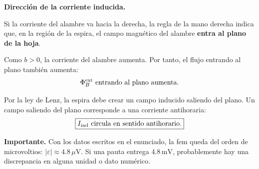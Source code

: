 \documentclass[11pt]{article}
\newcommand{\importante}[1]{%
  \par\medskip
  \noindent\textbf{Importante.} #1\par
}
\newcommand{\paso}[1]{%
  \par\medskip
  \noindent\textbf{#1}\par
  \vspace{0.1em}%
}
\begin{document}
\paso{Direcci\'on de la corriente inducida.}
Si la corriente del alambre va hacia la derecha, la regla de la mano derecha indica que, en la regi\'on de la espira, el campo magn\'etico del alambre \textbf{entra al plano de la hoja}.

Como $b>0$, la corriente del alambre aumenta. Por tanto, el flujo entrando al plano tambi\'en aumenta:
\begin{equation*}
    \Phi_B^{\rm ext}\ \text{entrando al plano aumenta}.
\end{equation*}

Por la ley de Lenz, la espira debe crear un campo inducido saliendo del plano. Un campo saliendo del plano corresponde a una corriente antihoraria:
\begin{equation*}
    \boxed{I_{\rm ind}\ \text{circula en sentido antihorario}.}
\end{equation*}

\importante{Con los datos escritos en el enunciado, la fem queda del orden de microvoltios: $|\varepsilon|\approx4.8\,\mu\mathrm{V}$. Si una pauta entrega $4.8\,\mathrm{mV}$, probablemente hay una discrepancia en alguna unidad o dato num\'erico.}
\end{document}

